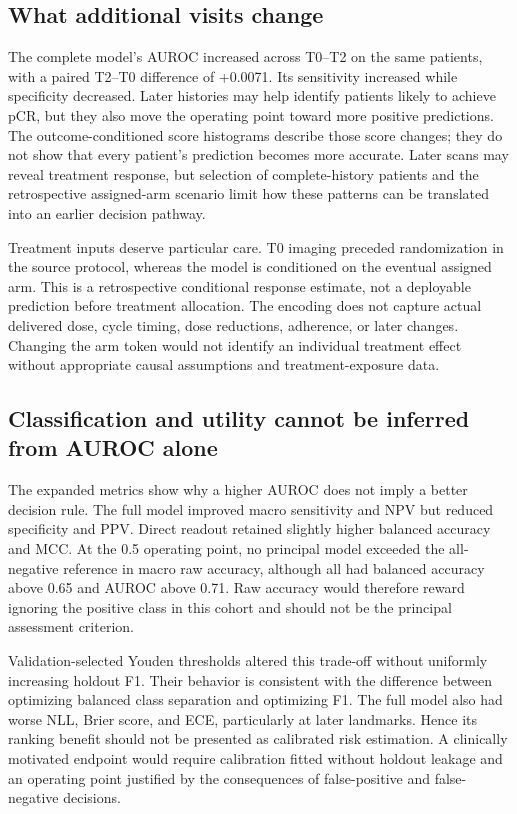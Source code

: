 \subsection{What additional visits change}
The complete model's AUROC increased across T0--T2 on the same patients, with a paired T2--T0 difference of +0.0071. Its sensitivity increased while specificity decreased. Later histories may help identify patients likely to achieve pCR, but they also move the operating point toward more positive predictions. The outcome-conditioned score histograms describe those score changes; they do not show that every patient's prediction becomes more accurate. Later scans may reveal treatment response, but selection of complete-history patients and the retrospective assigned-arm scenario limit how these patterns can be translated into an earlier decision pathway.

Treatment inputs deserve particular care. T0 imaging preceded randomization in the source protocol, whereas the model is conditioned on the eventual assigned arm. This is a retrospective conditional response estimate, not a deployable prediction before treatment allocation. The encoding does not capture actual delivered dose, cycle timing, dose reductions, adherence, or later changes. Changing the arm token would not identify an individual treatment effect without appropriate causal assumptions and treatment-exposure data.

\subsection{Classification and utility cannot be inferred from AUROC alone}
The expanded metrics show why a higher AUROC does not imply a better decision rule. The full model improved macro sensitivity and NPV but reduced specificity and PPV. Direct readout retained slightly higher balanced accuracy and MCC. At the 0.5 operating point, no principal model exceeded the all-negative reference in macro raw accuracy, although all had balanced accuracy above 0.65 and AUROC above 0.71. Raw accuracy would therefore reward ignoring the positive class in this cohort and should not be the principal assessment criterion.

Validation-selected Youden thresholds altered this trade-off without uniformly increasing holdout F1. Their behavior is consistent with the difference between optimizing balanced class separation and optimizing F1. The full model also had worse NLL, Brier score, and ECE, particularly at later landmarks. Hence its ranking benefit should not be presented as calibrated risk estimation. A clinically motivated endpoint would require calibration fitted without holdout leakage and an operating point justified by the consequences of false-positive and false-negative decisions.

